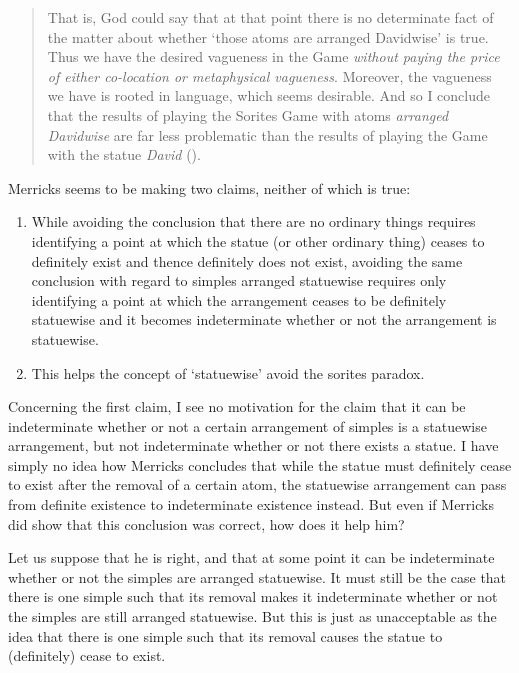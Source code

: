 \documentclass[11pt]{standalone} \newif\ifstandlone \standalonetrue
\newenvironment{squote}{%
	\begin{quote}\begin{singlespace}%
	}{%
	\end{singlespace}\end{quote}}
\begin{document}
\begin{spacing}{1.5}
\begin{squote}
That is, God could say that at that point there is no determinate fact
of the matter about whether `those atoms are arranged Davidwise' is
true.  Thus we have the desired vagueness in the Game {\em without
  paying the price of either co-location or metaphysical vagueness}.
Moreover, the vagueness we have is rooted in language, which seems
desirable.  And so I conclude that the results of playing the Sorites
Game with atoms {\em arranged Davidwise} are far less problematic than
the results of playing the Game with the statue {\em David}
(\citeyear[36--37]{merricks2001a}).
\end{squote}

Merricks seems to be making two claims, neither of which is true:

\begin{enumerate}
\item While avoiding the conclusion that there are no ordinary things
  requires identifying a point at which the statue (or other ordinary
  thing) ceases to definitely exist and thence definitely does not
  exist, avoiding the same conclusion with regard to simples arranged
  statuewise requires only identifying a point at which the
  arrangement ceases to be definitely statuewise and it becomes
  indeterminate whether or not the arrangement is statuewise.
\item This helps the concept of `statuewise' avoid the sorites
  paradox.
\end{enumerate}

Concerning the first claim, I see no motivation for the claim that it
can be indeterminate whether or not a certain arrangement of simples
is a statuewise arrangement, but not indeterminate whether or not
there exists a statue.  I have simply no idea how Merricks concludes
that while the statue must definitely cease to exist after the removal
of a certain atom, the statuewise arrangement can pass from definite
existence to indeterminate existence instead.  But even if Merricks
did show that this conclusion was correct, how does it help him?

Let us suppose that he is right, and that at some point it can be
indeterminate whether or not the simples are arranged statuewise.
It must still be the case that there is one simple such that its
removal makes it indeterminate whether or not the simples are still
arranged statuewise.  But this is just as unacceptable as the idea
that there is one simple such that its removal causes the statue to
(definitely) cease to exist.


\end{spacing}
\end{document}
